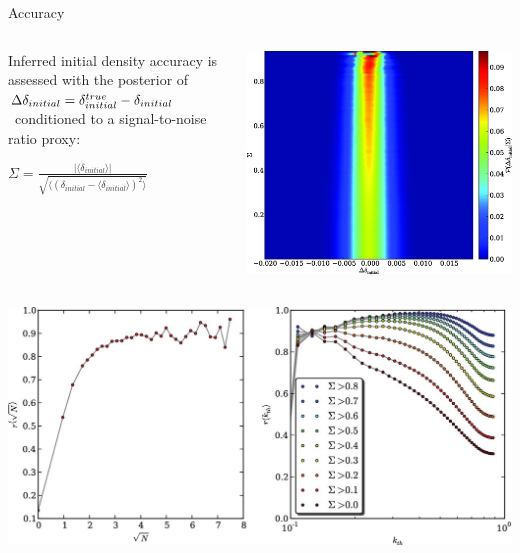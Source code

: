 \documentclass[10pt]{beamer}
\begin{document}
\begin{frame}[fragile]{Accuracy}
   \begin{columns}
 \begin{column}{0.65\textwidth} %
 Inferred initial density accuracy is assessed with the posterior of $\tiny\Delta\delta_{initial}=\delta_{initial}^{true}-\delta_{initial}$\ conditioned to a signal-to-noise ratio proxy:
 \begin{center}
\begingroup\makeatletter{}\check@mathfonts
$\Sigma=\frac{\lvert\langle\delta_{initial}\rangle\rvert}{\sqrt{\langle\left(\delta_{initial}-\langle\delta_{initial}\rangle\right)^2\rangle}}$
\endgroup
\end{center}
        \end{column}
        \begin{column}{0.3\textwidth} %
            \includegraphics[width=1.15\textwidth]{stt449fig8.jpeg}
        \end{column}
    \end{columns}
    \hfill
    \hspace{1cm}\pause
   \begin{columns}
 \begin{column}{0.5\textwidth} %
  \includegraphics[width=\textwidth]{stt449fig9.jpeg}

\end{column}
\end{columns}
\end{frame}
\end{document}
